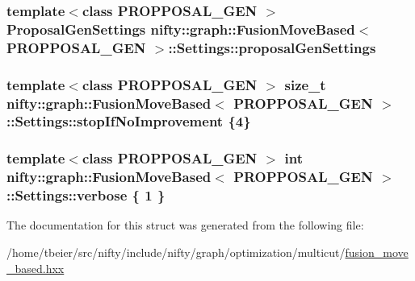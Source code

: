 \subsubsection[{proposal\+Gen\+Settings}]{\setlength{\rightskip}{0pt plus 5cm}template$<$class P\+R\+O\+P\+P\+O\+S\+A\+L\+\_\+\+G\+E\+N $>$ {\bf Proposal\+Gen\+Settings} {\bf nifty\+::graph\+::\+Fusion\+Move\+Based}$<$ P\+R\+O\+P\+P\+O\+S\+A\+L\+\_\+\+G\+E\+N $>$\+::Settings\+::proposal\+Gen\+Settings}\label{structnifty_1_1graph_1_1FusionMoveBased_1_1Settings_a4700ff94094b7bd4a7c6c8b9788771d3}
\hypertarget{structnifty_1_1graph_1_1FusionMoveBased_1_1Settings_adc2ee0aae71d78b553c123825535857d}{}
\subsubsection[{stop\+If\+No\+Improvement}]{\setlength{\rightskip}{0pt plus 5cm}template$<$class P\+R\+O\+P\+P\+O\+S\+A\+L\+\_\+\+G\+E\+N $>$ size\+\_\+t {\bf nifty\+::graph\+::\+Fusion\+Move\+Based}$<$ P\+R\+O\+P\+P\+O\+S\+A\+L\+\_\+\+G\+E\+N $>$\+::Settings\+::stop\+If\+No\+Improvement \{4\}}\label{structnifty_1_1graph_1_1FusionMoveBased_1_1Settings_adc2ee0aae71d78b553c123825535857d}
\hypertarget{structnifty_1_1graph_1_1FusionMoveBased_1_1Settings_a8b75aaaaf9cad68d1f2ae6de7d3e7979}{}
\subsubsection[{verbose}]{\setlength{\rightskip}{0pt plus 5cm}template$<$class P\+R\+O\+P\+P\+O\+S\+A\+L\+\_\+\+G\+E\+N $>$ int {\bf nifty\+::graph\+::\+Fusion\+Move\+Based}$<$ P\+R\+O\+P\+P\+O\+S\+A\+L\+\_\+\+G\+E\+N $>$\+::Settings\+::verbose \{ 1 \}}\label{structnifty_1_1graph_1_1FusionMoveBased_1_1Settings_a8b75aaaaf9cad68d1f2ae6de7d3e7979}


The documentation for this struct was generated from the following file\+:\begin{DoxyCompactItemize}
\item 
/home/tbeier/src/nifty/include/nifty/graph/optimization/multicut/\hyperlink{multicut_2fusion__move__based_8hxx}{fusion\+\_\+move\+\_\+based.\+hxx}\end{DoxyCompactItemize}
